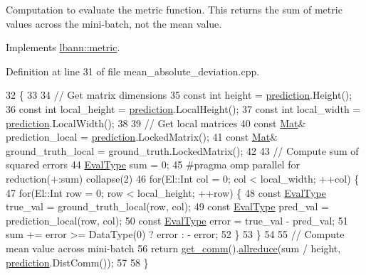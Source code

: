 Computation to evaluate the metric function. This returns the sum of metric values across the mini-\/batch, not the mean value. 

Implements \hyperlink{classlbann_1_1metric_aab79147ff480675db2e01d7a889a4296}{lbann\+::metric}.



Definition at line 31 of file mean\+\_\+absolute\+\_\+deviation.\+cpp.


\begin{DoxyCode}
32                                                                                           \{
33 
34   \textcolor{comment}{// Get matrix dimensions}
35   \textcolor{keyword}{const} \textcolor{keywordtype}{int} height = \hyperlink{base_8hpp_a2781a159088df64ed7d47cc91c4dc0a8ac41b9ec75e920b610e8907e066074b30}{prediction}.Height();
36   \textcolor{keyword}{const} \textcolor{keywordtype}{int} local\_height = \hyperlink{base_8hpp_a2781a159088df64ed7d47cc91c4dc0a8ac41b9ec75e920b610e8907e066074b30}{prediction}.LocalHeight();
37   \textcolor{keyword}{const} \textcolor{keywordtype}{int} local\_width = \hyperlink{base_8hpp_a2781a159088df64ed7d47cc91c4dc0a8ac41b9ec75e920b610e8907e066074b30}{prediction}.LocalWidth();
38   
39   \textcolor{comment}{// Get local matrices}
40   \textcolor{keyword}{const} \hyperlink{base_8hpp_a68f11fdc31b62516cb310831bbe54d73}{Mat}& prediction\_local = \hyperlink{base_8hpp_a2781a159088df64ed7d47cc91c4dc0a8ac41b9ec75e920b610e8907e066074b30}{prediction}.LockedMatrix();
41   \textcolor{keyword}{const} \hyperlink{base_8hpp_a68f11fdc31b62516cb310831bbe54d73}{Mat}& ground\_truth\_local = ground\_truth.LockedMatrix();
42 
43   \textcolor{comment}{// Compute sum of squared errors}
44   \hyperlink{base_8hpp_a3266f5ac18504bbadea983c109566867}{EvalType} sum = 0;
45 \textcolor{preprocessor}{  #pragma omp parallel for reduction(+:sum) collapse(2)}
46   \textcolor{keywordflow}{for}(El::Int col = 0; col < local\_width; ++col) \{
47     \textcolor{keywordflow}{for}(El::Int row = 0; row < local\_height; ++row) \{
48       \textcolor{keyword}{const} \hyperlink{base_8hpp_a3266f5ac18504bbadea983c109566867}{EvalType} true\_val = ground\_truth\_local(row, col);
49       \textcolor{keyword}{const} \hyperlink{base_8hpp_a3266f5ac18504bbadea983c109566867}{EvalType} pred\_val = prediction\_local(row, col);
50       \textcolor{keyword}{const} \hyperlink{base_8hpp_a3266f5ac18504bbadea983c109566867}{EvalType} error = true\_val - pred\_val;
51       sum += error >= DataType(0) ? error : - error;
52     \}
53   \}
54   
55   \textcolor{comment}{// Compute mean value across mini-batch}
56   \textcolor{keywordflow}{return} \hyperlink{classlbann_1_1metric_a464120720df6bfdf91bffe353e562964}{get\_comm}().\hyperlink{classlbann_1_1lbann__comm_af5631e5f0f54e4df4958eba9df2599ef}{allreduce}(sum / height, \hyperlink{base_8hpp_a2781a159088df64ed7d47cc91c4dc0a8ac41b9ec75e920b610e8907e066074b30}{prediction}.DistComm());
57   
58 \}
\end{DoxyCode}
